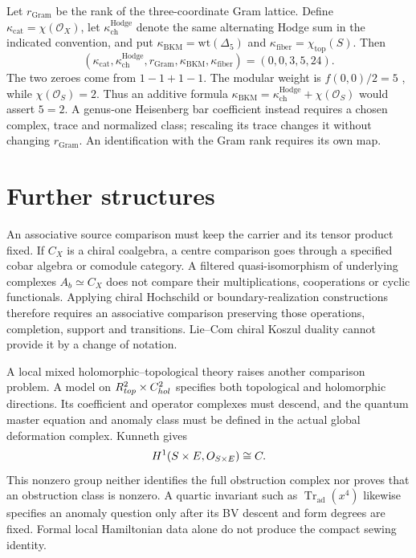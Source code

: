 \begin{remark}
\label{rem:zbps-kappa-stratum}
Let \(r_{\mathrm{Gram}}\) be the rank of the three-coordinate
Gram lattice.  Define \(\kappa_{\mathrm{cat}}=\chi(\mathcal O_X)\),
let \(\kappa_{\mathrm{ch}}^{\mathrm{Hodge}}\) denote the same
alternating Hodge sum in the indicated convention, and put
\(\kappa_{\mathrm{BKM}}=\mathrm{wt}(\Delta_5)\) and
\(\kappa_{\mathrm{fiber}}=\chi_{\mathrm{top}}(S)\).  Then
\begin{equation}\label{eq:zbps-kappa-tuple}
 (\kappa_{\mathrm{cat}},\kappa_{\mathrm{ch}}^{\mathrm{Hodge}},
 r_{\mathrm{Gram}},\kappa_{\mathrm{BKM}},\kappa_{\mathrm{fiber}})
 =(0,0,3,5,24).
\end{equation}
The two zeroes come from \(1-1+1-1\).  The modular weight is
\(f(0,0)/2=5\) \cite{Borcherds95,Gritsenko99}, while
\(\chi(\mathcal O_S)=2\).  Thus an additive formula
\(\kappa_{\mathrm{BKM}}=
\kappa_{\mathrm{ch}}^{\mathrm{Hodge}}+\chi(\mathcal O_S)\)
would assert \(5=2\).  A genus-one Heisenberg bar coefficient
instead requires a chosen complex, trace and normalized class;
rescaling its trace changes it without changing \(r_{\mathrm{Gram}}\).
An identification with the Gram rank requires its own map.
\end{remark}

\section{Further structures}
\label{sec:zbps-open-problems}

An associative source comparison must keep the carrier and its
tensor product fixed.  If \(C_X\) is a chiral coalgebra, a centre
comparison goes through a specified cobar algebra or comodule
category.  A filtered quasi-isomorphism of underlying complexes
\(A_b\simeq C_X\) does not compare their multiplications,
cooperations or cyclic functionals.  Applying chiral Hochschild
or boundary-realization constructions
\cite{ChiralBarCobarVolI,ChiralBarCobarVolII,ChiralBarCobarVolIV}
therefore requires an associative comparison preserving those
operations, completion, support and transitions.  Lie--Com
chiral Koszul duality cannot provide it by a change of notation.

A local mixed holomorphic--topological theory raises another
comparison problem.  A model on
\(R^2_{top}\times C^2_{hol}\) specifies both
topological and holomorphic directions.  Its coefficient and operator complexes
must descend, and the quantum master equation and anomaly class
must be defined in the actual global deformation complex.
Kunneth gives
\[
 H^1(S\times E,O_{S\times E})\cong C.
\]
This nonzero group neither identifies the full obstruction complex
nor proves that an obstruction class is nonzero.  A quartic
invariant such as \(\operatorname{Tr}_{\mathrm{ad}}(x^4)\)
likewise specifies an anomaly question only after its BV descent
and form degrees are fixed.  Formal local Hamiltonian data alone
do not produce the compact sewing identity.

